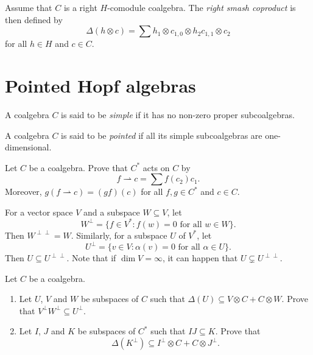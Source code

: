 \documentclass[12pt]{amsproc}
\begin{document}
Assume that $C$ is a right $H$-comodule coalgebra. The \emph{right
smash coproduct} is then defined by 
\[
\Delta(h\otimes c)=\sum h_{1}\otimes c_{1,0}\otimes h_{2}c_{1,1}\otimes c_{2}
\]
for all $h\in H$ and $c\in C$.

\section{Pointed Hopf algebras}


\begin{definition}
    A coalgebra $C$ is said to be \emph{simple} if it has no
    non-zero proper subcoalgebras. 
\end{definition}

\begin{definition}
    A coalgebra $C$ is said to be \emph{pointed} if all its 
    simple subcoalgebras are one-dimensional. 
\end{definition}

\begin{exercise}
\label{xca:Cdual_on_C}
    Let $C$ be a coalgebra. Prove that 
    $C^*$ acts on $C$ by
    \[
    f\rightharpoonup c=\sum f(c_2)c_1.
    \]
    Moreover, $g(f\rightharpoonup c)=(gf)(c)$ for 
    all $f,g\in C^*$ and $c\in C$. 
\end{exercise}

For a vector space $V$ and a subspace $W\subseteq V$, let 
\[
W^\perp=\{f\in V^*:f(w)=0\text{ for all $w\in W$}\}.
\]
Then $W^{\perp\perp}=W$. 
Similarly, for a subspace $U$ of $V^*$, let 
\[
U^\perp=\{v\in V:\alpha(v)=0\text{ for all $\alpha\in U$}\}.
\]
Then $U\subseteq U^{\perp\perp}$. Note that
if $\dim V=\infty$, it can happen that $U\subsetneq U^{\perp\perp}$. 

\begin{exercise}
\label{xca:dual}
    Let $C$ be a coalgebra. 
    \begin{enumerate}
        \item Let $U$, $V$ and $W$ be subspaces of $C$ such that 
    $\Delta(U)\subseteq V\otimes C+C\otimes W$. Prove that 
    $V^\perp W^\perp\subseteq U^\perp$. 
    \item Let $I$, $J$ and $K$ be subspaces of $C^*$ 
    such that $IJ\subseteq K$. Prove that 
    \[
    \Delta(K^\perp)\subseteq I^\perp\otimes C+C\otimes J^\perp.
    \]
    \end{enumerate}
\end{exercise}
\end{document}
